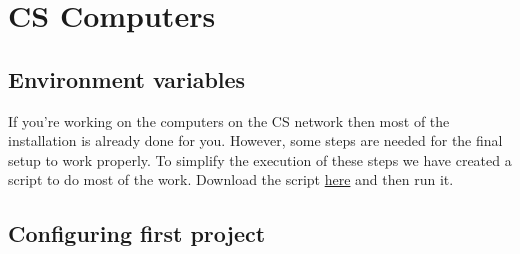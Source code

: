\documentclass{article}
\begin{document}
\section{CS Computers}



	\subsection{Environment variables}
		If you're working on the computers on the CS network then most of the installation is already done for you. However, some steps are needed for the final setup to work properly. To simplify
		the execution of these steps we have created a script to do most of the work. Download the script \href{static/setup_antlr.sh}{here} and
		then run it.

	\subsection{Configuring first project}
\end{document}
